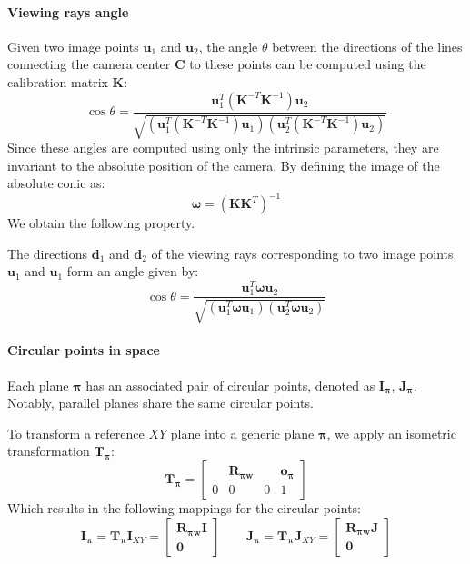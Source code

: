 \paragraph*{Viewing rays angle}
Given two image points $\mathbf{u}_1$ and $\mathbf{u}_2$, the angle $\theta$ between the directions of the lines connecting the camera center $\mathbf{C}$ to these points can be computed using the calibration matrix $\mathbf{K}$:
\[\cos\theta=\dfrac{\mathbf{u}_1^T\left(\mathbf{K}^{-T}\mathbf{K}^{-1}\right)\mathbf{u}_2}{\sqrt{\left(\mathbf{u}_1^T\left(\mathbf{K}^{-T}\mathbf{K}^{-1}\right)\mathbf{u}_1\right)\left(\mathbf{u}_2^T\left(\mathbf{K}^{-T}\mathbf{K}^{-1}\right)\mathbf{u}_2\right)}}\]
Since these angles are computed using only the intrinsic parameters, they are invariant to the absolute position of the camera.
By defining the image of the absolute conic as:
\[\boldsymbol{\omega}=\left(\mathbf{KK}^T\right)^{-1}\]
We obtain the following property.
\begin{property}
    The directions $\mathbf{d}_1$ and $\mathbf{d}_2$ of the viewing rays corresponding to two image points $\mathbf{u}_1$ and $\mathbf{u}_1$ form an angle given by: 
    \[\cos\theta=\dfrac{\mathbf{u}_1^T\boldsymbol{\omega}\mathbf{u}_2}{\sqrt{\left(\mathbf{u}_1^T\boldsymbol{\omega}\mathbf{u}_1\right)\left(\mathbf{u}_2^T\boldsymbol{\omega}\mathbf{u}_2\right)}}\]
\end{property}

\paragraph*{Circular points in space}
Each plane $\boldsymbol{\pi}$ has an associated pair of circular points, denoted as $\mathbf{I}_\mathbf{\pi}$, $\mathbf{J}_\mathbf{\pi}$. 
Notably, parallel planes share the same circular points.

To transform a reference $XY$ plane into a generic plane $\boldsymbol{\pi}$, we apply an isometric transformation $\mathbf{T}_{\boldsymbol{\pi}}$: 
\[\mathbf{T}_{\boldsymbol{\pi}}=\begin{bmatrix} & \mathbf{R}_{\boldsymbol{\pi}\mathbf{w}} & & \mathbf{o}_{\boldsymbol{\pi}} \\ 0 & 0 & 0 & 1 \end{bmatrix}\]
Which results in the following mappings for the circular points:
\[\mathbf{I}_{\boldsymbol{\pi}}=\mathbf{T}_{\boldsymbol{\pi}}\mathbf{I}_{XY}=\begin{bmatrix}\mathbf{R}_{\boldsymbol{\pi}\mathbf{w}}\mathbf{I} \\ \mathbf{0}\end{bmatrix} \qquad \mathbf{J}_{\boldsymbol{\pi}}=\mathbf{T}_{\boldsymbol{\pi}}\mathbf{J}_{XY}=\begin{bmatrix}\mathbf{R}_{\boldsymbol{\pi}\mathbf{w}}\mathbf{J} \\ \mathbf{0}\end{bmatrix}\]

